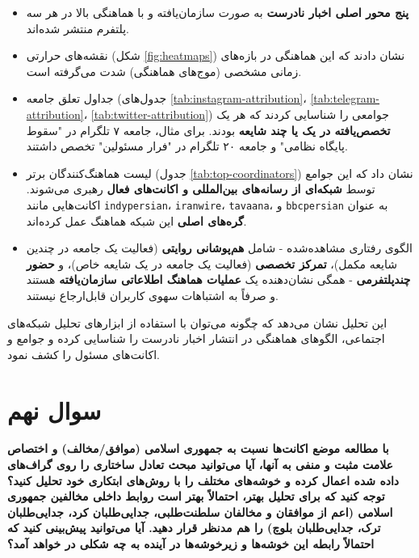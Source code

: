 \documentclass{article}
\begin{document}
	\begin{itemize}
		\item \textbf{پنج محور اصلی اخبار نادرست} به صورت سازمان‌یافته و با هماهنگی بالا در هر سه پلتفرم منتشر شده‌اند.
		\item نقشه‌های حرارتی (شکل \ref{fig:heatmaps}) نشان دادند که این هماهنگی در بازه‌های زمانی مشخصی (موج‌های هماهنگی) شدت می‌گرفته است.
		\item جداول تعلق جامعه (جدول‌های \ref{tab:instagram-attribution}، \ref{tab:telegram-attribution}، \ref{tab:twitter-attribution}) جوامعی را شناسایی کردند که هر یک \textbf{تخصص‌یافته در یک یا چند شایعه} بودند. برای مثال، جامعه ۷ تلگرام در "سقوط پایگاه نظامی" و جامعه ۲۰ تلگرام در "فرار مسئولین" تخصص داشتند.
		\item لیست هماهنگ‌کنندگان برتر (جدول \ref{tab:top-coordinators}) نشان داد که این جوامع توسط \textbf{شبکه‌ای از رسانه‌های بین‌المللی و اکانت‌های فعال} رهبری می‌شوند. اکانت‌هایی مانند \texttt{indypersian}، \texttt{iranwire}، \texttt{tavaana}، و \texttt{bbcpersian} به عنوان \textbf{گره‌های اصلی} این شبکه هماهنگ عمل کرده‌اند.
		\item الگوی رفتاری مشاهده‌شده - شامل \textbf{هم‌پوشانی روایتی} (فعالیت یک جامعه در چندین شایعه مکمل)، \textbf{تمرکز تخصصی} (فعالیت یک جامعه در یک شایعه خاص)، و \textbf{حضور چندپلتفرمی} - همگی نشان‌دهنده یک \textbf{عملیات هماهنگ اطلاعاتی سازمان‌یافته} هستند و صرفاً به اشتباهات سهوی کاربران قابل‌ارجاع نیستند.
	\end{itemize}
	
	این تحلیل نشان می‌دهد که چگونه می‌توان با استفاده از ابزارهای تحلیل شبکه‌های اجتماعی، الگوهای هماهنگی در انتشار اخبار نادرست را شناسایی کرده و جوامع و اکانت‌های مسئول را کشف نمود.

\FloatBarrier
\section{سوال نهم}
\textbf{با مطالعه موضع اکانت‌ها نسبت به جمهوری اسلامی (موافق/مخالف) و اختصاص علامت مثبت و منفی به آنها، آیا می‌توانید مبحث تعادل ساختاری را روی گراف‌های داده شده اعمال کرده و خوشه‌های مختلف را با روش‌های ابتکاری خود تحلیل کنید؟
	توجه کنید که برای تحلیل بهتر، احتمالاً بهتر است روابط داخلی مخالفین جمهوری اسلامی (اعم از موافقان و مخالفان سلطنت‌طلبی، جدایی‌طلبان کرد، جدایی‌طلبان ترک، جدایی‌طلبان بلوچ) را هم مدنظر قرار دهید.
	آیا می‌توانید پیش‌بینی کنید که احتمالاً رابطه این خوشه‌ها و زیرخوشه‌ها در آینده به چه شکلی در خواهد آمد؟}
\\
\end{document}
